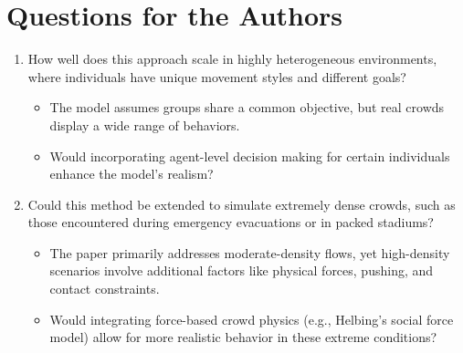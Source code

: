 \documentclass[12pt]{article}
\begin{document}
\section{Questions for the Authors}
\begin{enumerate}[noitemsep]
    \item How well does this approach scale in highly heterogeneous environments, where individuals have unique movement styles and different goals?
    \begin{itemize}[noitemsep]
        \item The model assumes groups share a common objective, but real crowds display a wide range of behaviors.
        \item Would incorporating agent-level decision making for certain individuals enhance the model's realism?
    \end{itemize}
    \item Could this method be extended to simulate extremely dense crowds, such as those encountered during emergency evacuations or in packed stadiums?
    \begin{itemize}[noitemsep]
        \item The paper primarily addresses moderate-density flows, yet high-density scenarios involve additional factors like physical forces, pushing, and contact constraints.
        \item Would integrating force-based crowd physics (e.g., Helbing's social force model) allow for more realistic behavior in these extreme conditions?
    \end{itemize}
\end{enumerate}
\end{document}
